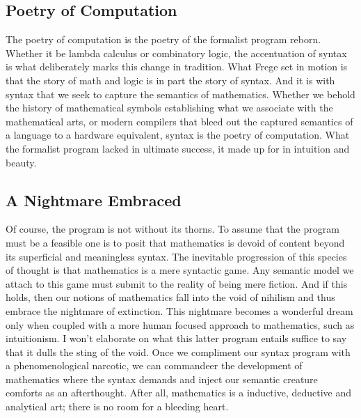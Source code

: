 \subsection{Poetry of Computation}
The poetry of computation is the poetry of the formalist program reborn.
Whether it be lambda calculus or combinatory logic, the accentuation of syntax
is what deliberately marks this change in tradition. What Frege set in motion
is that the story of math and logic is in part the story of syntax. And it is
with syntax that we seek to capture the semantics of mathematics. Whether we
behold the history of mathematical symbols establishing what we associate with
the mathematical arts, or modern compilers that bleed out the captured
semantics of a language to a hardware equivalent, syntax is the poetry of
computation. What the formalist program lacked in ultimate success, it made up
for in intuition and beauty.

\subsection{A Nightmare Embraced}
Of course, the program is not without its thorns. To assume that the program
must be a feasible one is to posit that mathematics is devoid of content beyond
its superficial and meaningless syntax. The inevitable progression of this
species of thought is that mathematics is a mere syntactic game. Any semantic
model we attach to this game must submit to the reality of being mere fiction.
And if this holds, then our notions of mathematics fall into the void of
nihilism and thus embrace the nightmare of extinction. This nightmare becomes a
wonderful dream only when coupled with a more human focused approach to
mathematics, such as intuitionism. I won't elaborate on what this latter
program entails suffice to say that it dulls the sting of the void. Once we
compliment our syntax program with a phenomenological narcotic, we can
commandeer the development of mathematics where the syntax demands and inject
our semantic creature comforts as an afterthought. After all, mathematics is a
inductive, deductive and analytical art; there is no room for a bleeding heart.

